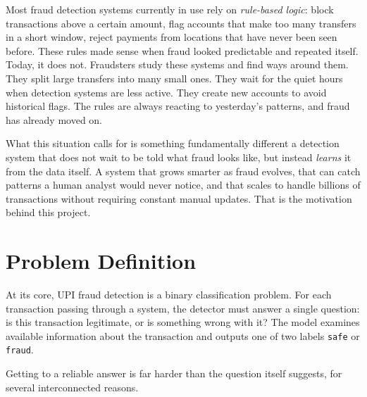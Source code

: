 Most fraud detection systems currently in use rely on \textit{rule-based logic}: block transactions above a certain amount, flag accounts that make too many transfers in a short window, reject payments from locations that have never been seen before. These rules made sense when fraud looked predictable and repeated itself. Today, it does not. Fraudsters study these systems and find ways around them. They split large transfers into many small ones. They wait for the quiet hours when detection systems are less active. They create new accounts to avoid historical flags. The rules are always reacting to yesterday's patterns, and fraud has already moved on.

What this situation calls for is something fundamentally different a detection system that does not wait to be told what fraud looks like, but instead \textit{learns} it from the data itself. A system that grows smarter as fraud evolves, that can catch patterns a human analyst would never notice, and that scales to handle billions of transactions without requiring constant manual updates. That is the motivation behind this project.

\section{Problem Definition}

At its core, UPI fraud detection is a binary classification problem. For each transaction passing through a system, the detector must answer a single question: is this transaction legitimate, or is something wrong with it? The model examines available information about the transaction and outputs one of two labels \texttt{safe} or \texttt{fraud}.

Getting to a reliable answer is far harder than the question itself suggests, for several interconnected reasons.

